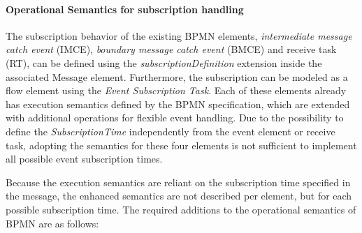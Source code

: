 \paragraph{Operational Semantics for subscription handling}
The subscription behavior of the existing BPMN elements, \textit{intermediate message catch event} (IMCE), \textit{boundary message catch event} (BMCE) and receive task (RT), can be defined using the \textit{subscriptionDefinition} extension inside the associated Message element.
Furthermore, the subscription can be modeled as a flow element using the \textit{Event Subscription Task}.
Each of these elements already has execution semantics defined by the BPMN specification, which are extended with additional operations for flexible event handling.
Due to the possibility to define the \textit{SubscriptionTime} independently from the event element or receive task, adopting the semantics for these four elements is not sufficient to implement all possible event subscription times.

Because the execution semantics are reliant on the subscription time specified in the message, the enhanced semantics are not described per element, but for each possible subscription time.
The required additions to the operational semantics of BPMN are as follows:

